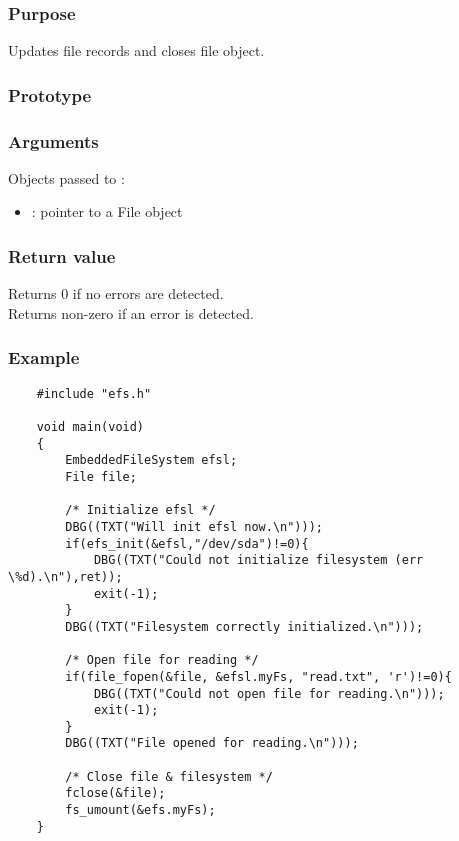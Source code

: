 \subsubsection*{Purpose}
Updates file records and closes file object.
\subsubsection*{Prototype}
\subsubsection*{Arguments}
Objects passed to :
\begin{itemize}
	\item{: pointer to a File object}
\end{itemize}
\subsubsection*{Return value}
Returns 0 if no errors are detected.\\
\newline
Returns non-zero if an error is detected.
\subsubsection*{Example}
\lstset{numbers=left, stepnumber=1, numberstyle=\small, numbersep=5pt, tabsize=4}
\begin{lstlisting}
	#include "efs.h"

	void main(void)
	{
		EmbeddedFileSystem efsl;
		File file;

		/* Initialize efsl */
		DBG((TXT("Will init efsl now.\n")));
		if(efs_init(&efsl,"/dev/sda")!=0){
			DBG((TXT("Could not initialize filesystem (err \%d).\n"),ret));
			exit(-1);
		}
		DBG((TXT("Filesystem correctly initialized.\n")));

		/* Open file for reading */
		if(file_fopen(&file, &efsl.myFs, "read.txt", 'r')!=0){
			DBG((TXT("Could not open file for reading.\n")));
			exit(-1);
		}
		DBG((TXT("File opened for reading.\n")));

		/* Close file & filesystem */
		fclose(&file);
		fs_umount(&efs.myFs);
	}
\end{lstlisting}
